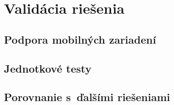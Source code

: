 \chapter{Validácia riešenia}
\section{Podpora mobilných zariadení}
\section{Jednotkové testy}
\section{Porovnanie s~ďalšími riešeniami}